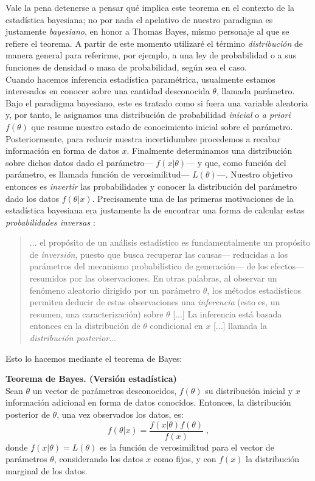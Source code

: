 Vale la pena detenerse a pensar qué implica este teorema en el contexto de la estadística bayesiana; no por nada el apelativo de nuestro paradigma es justamente \textit{bayesiano}, en honor a Thomas Bayes, mismo personaje al que se refiere el teorema. A partir de este momento utilizaré el término \textit{distribución} de manera general para referirme, por ejemplo, a una ley de probabilidad o a sus funciones de densidad o masa de probabilidad, según sea el caso.\\ 

Cuando hacemos inferencia estadística paramétrica, usualmente estamos interesados en conocer sobre una cantidad desconocida $\theta$, llamada parámetro. Bajo el paradigma bayesiano, este es tratado como si fuera una variable aleatoria y, por tanto, le asignamos una  distribución de probabilidad \textit{inicial} o \textit{a priori} $f(\theta)$ que resume nuestro estado de conocimiento inicial sobre el parámetro. Posteriormente, para reducir nuestra incertidumbre procedemos a recabar información en forma de datos $x$. Finalmente determinamos una distribución sobre dichos datos dado el parámetro--- $f(x|\theta)$--- y que, como función del parámetro, es llamada función de verosimilitud--- $L(\theta)$---. Nuestro objetivo entonces es \textit{invertir} las probabilidades y conocer la distribución del parámetro dado los datos $f(\theta|x)$. Precisamente una de las primeras motivaciones de la estadística bayesiana era justamente la de encontrar una forma de calcular estas \textit{probabilidades inversas} \citep{Robert07}: 
\begin{quote}
... el propósito de un análisis estadístico es fundamentalmente un propósito de \textit{inversión}, puesto que busca recuperar las causas--- reducidas a los parámetros del mecanismo probabilístico de generación--- de los efectos--- resumidos por las observaciones. En otras palabras, al observar un fenómeno aleatorio dirigido por un parámetro $\theta$, los métodos estadísticos permiten deducir de estas observaciones una \textit{inferencia} (esto es, un resumen, una caracterización) sobre $\theta$ [...] La inferencia está basada entonces en la distribución de $\theta$ condicional en $x$ [...] llamada la \textit{distribución posterior}...
\end{quote} 

Esto lo hacemos mediante el teorema de Bayes: 

\begin{teo} \label{teo:Bayes_2}
\textbf{Teorema de Bayes. (Versión estadística)}\\
Sean $\theta$ un vector de parámetros desconocidos, $f(\theta)$ su distribución inicial y $x$ información adicional en forma de datos conocidos. Entonces, la distribución posterior de $\theta$, una vez observados los datos, es: 
\begin{equation*}
f(\theta|x)=\dfrac{f(x|\theta)f(\theta)}{f(x)}\;,
\end{equation*}
donde $f(x|\theta) = L(\theta)$ es la función de verosimilitud para el vector de parámetros $\theta$, considerando los datos $x$ como fijos, y con $f(x)$ la distribución marginal de los datos. 
\end{teo}

